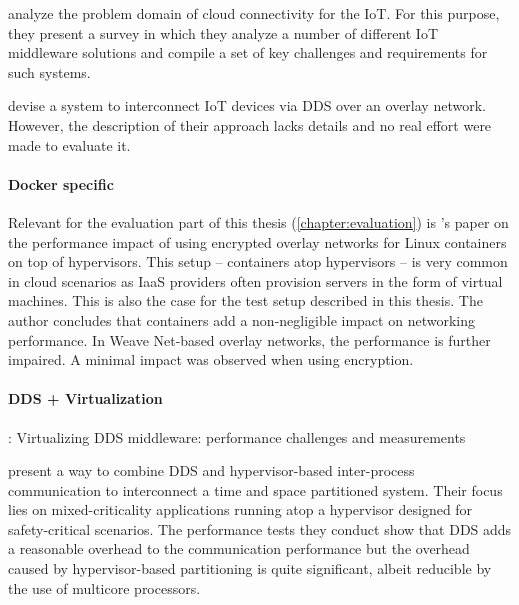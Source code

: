 \citeauthor*{farahzadi2017middleware} \cite{farahzadi2017middleware} analyze the problem domain of cloud connectivity for the IoT. For this purpose, they present a survey in which they analyze a number of different IoT middleware solutions and compile a set of key challenges and requirements for such systems.

\citeauthor*{hakiri2015publish} \cite{hakiri2015publish} devise a system to interconnect IoT devices via DDS over an overlay network. However, the description of their approach lacks details and no real effort were made to evaluate it.


\paragraph{Docker specific}

Relevant for the evaluation part of this thesis (\autoref{chapter:evaluation}) is \citeauthor*{kratzke2017microservices}'s paper \cite{kratzke2017microservices} on the performance impact of using encrypted overlay networks for Linux containers on top of hypervisors. This setup -- containers atop hypervisors -- is very common in cloud scenarios as IaaS providers often provision servers in the form of virtual machines. This is also the case for the test setup described in this thesis. The author concludes that containers add a non-negligible impact on networking performance. In Weave Net-based overlay networks, the performance is further impaired. A minimal impact was observed when using encryption.



\paragraph{DDS + Virtualization}
\cite{serrano2013virtualizing}: Virtualizing DDS middleware: performance challenges and measurements

\citeauthor*{perez:gutierrez:ieeetpds16} \cite{perez:gutierrez:ieeetpds16} present a way to combine DDS and hypervisor-based inter-process communication to interconnect a time and space partitioned system. Their focus lies on mixed-criticality applications running atop a hypervisor designed for safety-critical scenarios. The performance tests they conduct show that DDS adds a reasonable overhead to the communication performance but the overhead caused by hypervisor-based partitioning is quite significant, albeit reducible by the use of multicore processors.

